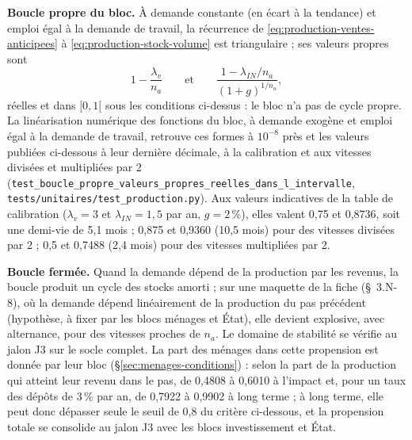 \documentclass[11pt,a4paper]{article}
\begin{document}
\textbf{Boucle propre du bloc.} À demande constante (en écart à la tendance) et emploi égal à la demande de travail, la récurrence de \eqref{eq:production-ventes-anticipees} à \eqref{eq:production-stock-volume} est triangulaire ; ses valeurs propres sont
\begin{equation*}
1 - \frac{\lambda_v}{n_a} \qquad\text{et}\qquad \frac{1 - \lambda_{\mathit{IN}}/n_a}{(1 + g)^{1/n_a}} ,
\end{equation*}
réelles et dans $[0, 1[$ sous les conditions ci-dessus : le bloc n'a pas de cycle propre. La linéarisation numérique des fonctions du bloc, à demande exogène et emploi égal à la demande de travail, retrouve ces formes à $10^{-8}$ près et les valeurs publiées ci-dessous à leur dernière décimale, à la calibration et aux vitesses divisées et multipliées par 2 (\nolinkurl{test_boucle_propre_valeurs_propres_reelles_dans_l_intervalle}, \nolinkurl{tests/unitaires/test_production.py}). Aux valeurs indicatives de la table de calibration ($\lambda_v = 3$ et $\lambda_{\mathit{IN}} = 1{,}5$ par an, $g = 2\,\%$), elles valent 0,75 et 0,8736, soit une demi-vie de 5,1 mois ; 0,875 et 0,9360 (10,5 mois) pour des vitesses divisées par 2 ; 0,5 et 0,7488 (2,4 mois) pour des vitesses multipliées par 2.

\textbf{Boucle fermée.} Quand la demande dépend de la production par les revenus, la boucle produit un cycle des stocks amorti ; sur une maquette de la fiche (\S~3.N-8), où la demande dépend linéairement de la production du pas précédent (hypothèse, à fixer par les blocs ménages et État), elle devient explosive, avec alternance, pour des vitesses proches de $n_a$. Le domaine de stabilité se vérifie au jalon J3 sur le socle complet. La part des ménages dans cette propension est donnée par leur bloc (\S\ref{sec:menages-conditions}) : selon la part de la production qui atteint leur revenu dans le pas, de 0,4808 à 0,6010 à l'impact et, pour un taux des dépôts de 3\,\% par an, de 0,7922 à 0,9902 à long terme ; à long terme, elle peut donc dépasser seule le seuil de 0,8 du critère ci-dessous, et la propension totale se consolide au jalon J3 avec les blocs investissement et État.
\end{document}
